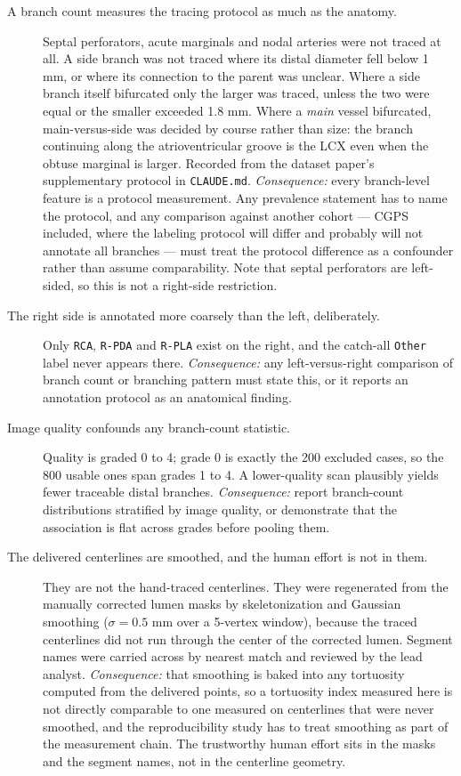\begin{description}

\item[A branch count measures the tracing protocol as much as the anatomy.]
Septal perforators, acute marginals and nodal arteries were not traced at all. A side branch was not
traced where its distal diameter fell below 1 mm, or where its connection to the parent was unclear.
Where a side branch itself bifurcated only the larger was traced, unless the two were equal or the
smaller exceeded 1.8 mm. Where a \emph{main} vessel bifurcated, main-versus-side was decided by
course rather than size: the branch continuing along the atrioventricular groove is the LCX even
when the obtuse marginal is larger. Recorded from the dataset paper's supplementary protocol in
\texttt{CLAUDE.md}.
\textit{Consequence:} every branch-level feature is a protocol measurement. Any prevalence statement
has to name the protocol, and any comparison against another cohort --- CGPS included, where the
labeling protocol will differ and probably will not annotate all branches --- must treat the
protocol difference as a confounder rather than assume comparability. Note that septal perforators
are left-sided, so this is not a right-side restriction.

\item[The right side is annotated more coarsely than the left, deliberately.]
Only \texttt{RCA}, \texttt{R-PDA} and \texttt{R-PLA} exist on the right, and the catch-all
\texttt{Other} label never appears there.
\textit{Consequence:} any left-versus-right comparison of branch count or branching pattern must
state this, or it reports an annotation protocol as an anatomical finding.

\item[Image quality confounds any branch-count statistic.]
Quality is graded 0 to 4; grade 0 is exactly the 200 excluded cases, so the 800 usable ones span
grades 1 to 4. A lower-quality scan plausibly yields fewer traceable distal branches.
\textit{Consequence:} report branch-count distributions stratified by image quality, or demonstrate
that the association is flat across grades before pooling them.

\item[The delivered centerlines are smoothed, and the human effort is not in them.]
They are not the hand-traced centerlines. They were regenerated from the manually corrected lumen
masks by skeletonization and Gaussian smoothing ($\sigma = 0.5$ mm over a 5-vertex window), because
the traced centerlines did not run through the center of the corrected lumen. Segment names were
carried across by nearest match and reviewed by the lead analyst.
\textit{Consequence:} that smoothing is baked into any tortuosity computed from the delivered
points, so a tortuosity index measured here is not directly comparable to one measured on
centerlines that were never smoothed, and the reproducibility study has to treat smoothing as part of the
measurement chain. The trustworthy human effort sits in the masks and the segment names, not in the
centerline geometry.

\end{description}


